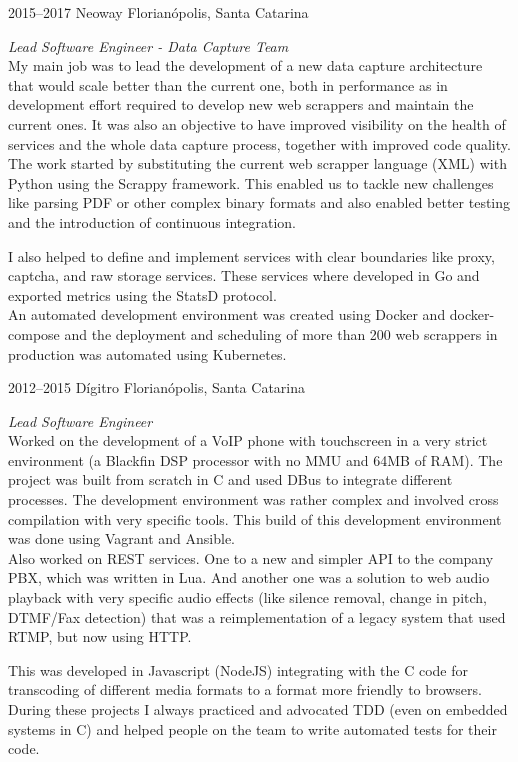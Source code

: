 \documentclass[]{friggeri-cv} %
\begin{document}
\begin{entrylist}
\entry
{2015--2017}
{Neoway}
{Florianópolis, Santa Catarina}
{\emph{Lead Software Engineer - Data Capture Team} \\

My main job was to lead the development of a new
data capture architecture that would scale better than
the current one, both in performance as in development
effort required to develop new web scrappers and maintain
the current ones. It was also an objective to have
improved visibility on the health of services
and the whole data capture process, together with
improved code quality.\\

The work started by substituting the current web scrapper
language (XML) with Python using the Scrappy framework.
This enabled us to tackle new challenges like parsing
PDF or other complex binary formats and also enabled better
testing and the introduction of continuous integration.

I also helped to define and implement services with clear
boundaries like proxy, captcha, and raw storage services.
These services where developed in Go and exported metrics using
the StatsD protocol.\\

An automated development environment was created using
Docker and docker-compose and
the deployment and scheduling of more than 200 web scrappers
in production was automated using Kubernetes.
}
\end{entrylist}

\begin{entrylist}
\entry
{2012--2015}
{Dígitro}
{Florianópolis, Santa Catarina}
{\emph{Lead Software Engineer} \\

Worked on the development of a VoIP phone with touchscreen
in a very strict environment
(a Blackfin DSP processor with no MMU and 64MB of RAM).
The project was built from scratch in C and used
DBus to integrate different processes. The development environment
was rather complex and involved cross compilation with
very specific tools. This build of this development environment
was done using Vagrant and Ansible. \\

Also worked on REST services. One to a new and simpler API to
the company PBX, which was written in Lua. And another one
was a solution to web audio playback with very specific audio effects
(like silence removal, change in pitch, DTMF/Fax detection)
that was a reimplementation
of a legacy system that used RTMP, but now using HTTP.

This was developed in Javascript (NodeJS) integrating with the
C code for transcoding of different media formats to a format
more friendly to browsers.\\

During these projects I always practiced and advocated TDD
(even on embedded systems in C) and helped people on
the team to write automated tests for their code.
}
\end{entrylist}
\end{document}
